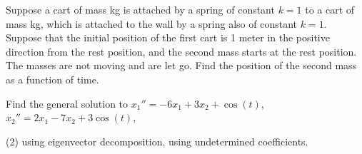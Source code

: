 \documentclass{ximera}
\begin{document}
\begin{exercise}%
    Suppose a cart of mass \unit[2]{kg} is attached by a spring of constant $k=1$ to a cart of mass \unit[3]{kg}, which is attached to the wall by a spring also of constant $k=1$. Suppose that the initial position of the first cart is 1 meter in the positive direction from the rest position, and the second mass starts at the rest position.  The masses are not moving and are let go.  Find the position of the second mass as a function of time.
\end{exercise}

\begin{exercise}
    Find the general solution to $x_1'' = -6x_1+ 3x_2 + \cos (t)$,  $x_2'' = 2x_1 -7x_2 + 3\cos (t)$,
    \begin{tasks}(2)
        \task using eigenvector decomposition,
        \task using undetermined coefficients.
    \end{tasks}
\end{exercise}
\end{document}
